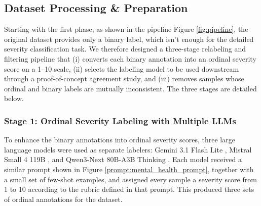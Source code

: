 \documentclass[conference]{IEEEtran}
\begin{document}
\subsection{Dataset Processing \& Preparation}
Starting with the first phase, as shown in the pipeline Figure \ref{fig:pipeline}, the original dataset \cite{mahawar2025genai} provides only a binary label, which isn't enough for the detailed severity classification task. We therefore designed a three-stage relabeling and filtering pipeline that (i) converts each binary annotation into an ordinal severity score on a 1--10 scale, (ii) selects the labeling model to be used downstream through a proof-of-concept agreement study, and (iii) removes samples whose ordinal and binary labels are mutually inconsistent. The three stages are detailed below.

\subsubsection{Stage 1: Ordinal Severity Labeling with Multiple LLMs}
To enhance the binary annotations into ordinal severity scores, three large language models were used as separate labelers: Gemini 3.1 Flash Lite \cite{gemini31flashlite2026}, Mistral Small 4 119B \cite{mistralsmall4119b2026}, and Qwen3-Next 80B-A3B Thinking \cite{qwen3next80ba3bthinking2025}. Each model received a similar prompt shown in Figure \ref{prompt:mental_health_prompt}, together with a small set of few-shot examples, and assigned every sample a severity score from 1 to 10 according to the rubric defined in that prompt. This produced three sets of ordinal annotations for the dataset.
\end{document}
